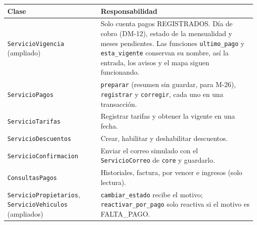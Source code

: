 \begin{longtable}{>{\raggedright\arraybackslash}p{4.2cm}>{\raggedright\arraybackslash}p{10.2cm}}
\toprule
\textbf{Clase} & \textbf{Responsabilidad}\\
\midrule\endhead
\texttt{ServicioVigencia} (ampliado) & Solo cuenta pagos REGISTRADOS. Día de cobro (DM-12), estado de la mensualidad y meses pendientes. Las funciones \texttt{ultimo\_pago} y \texttt{esta\_vigente} conservan su nombre, así la entrada, los avisos y el mapa siguen funcionando.\\
\texttt{ServicioPagos} & \texttt{preparar} (resumen sin guardar, para M-26), \texttt{registrar} y \texttt{corregir}, cada uno en una transacción.\\
\texttt{ServicioTarifas} & Registrar tarifas y obtener la vigente en una fecha.\\
\texttt{ServicioDescuentos} & Crear, habilitar y deshabilitar descuentos.\\
\texttt{ServicioConfirmacion} & Enviar el correo simulado con el \texttt{ServicioCorreo} de \texttt{core} y guardarlo.\\
\texttt{ConsultasPagos} & Historiales, factura, por vencer e ingresos (solo lectura).\\
\texttt{ServicioPropietarios}, \texttt{ServicioVehiculos} (ampliados) & \texttt{cambiar\_estado} recibe el motivo; \texttt{reactivar\_por\_pago} solo reactiva si el motivo es FALTA\_PAGO.\\
\bottomrule
\end{longtable}



